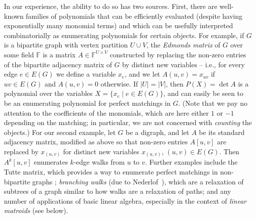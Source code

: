 \documentclass{theoretics}
\newcommand{\F}{\ensuremath{\mathbb F}\xspace}
\begin{document}
In our experience, the ability to do so has two sources. First, there are
well-known families of polynomials that can be efficiently evaluated
(despite having exponentially many monomial terms) and which can be
usefully interpreted combinatorially as enumerating polynomials for
certain objects. For example, if $G$ is a bipartite graph with vertex
partition $U \cup V$, the \emph{Edmonds matrix} of $G$ over some field $\F$ 
is a matrix $A \in \F^{U \times V}$ constructed by replacing
the non-zero entries of the bipartite adjacency matrix of $G$ by
distinct new variables -- i.e., for every edge $e \in E(G)$ we define
a variable $x_e$, and we let $A(u,v)=x_{uv}$ if $uv \in E(G)$ and
$A(u,v)=0$ otherwise. If $|U|=|V|$, then $P(X)=\det A$ is a polynomial
over the variables $X=\{x_e \mid e \in E(G)\}$, and can easily be seen
to be an enumerating polynomial for perfect matchings in $G$.
(Note that we pay no attention to the coefficients of the monomials,
which are here either $1$ or $-1$ depending on the matching; in
particular, we are not concerned with \emph{counting} the objects.)
For our second example, let $G$ be a digraph, and let $A$ be its
standard adjacency matrix, modified as above so that
non-zero entries $A[u,v]$ are replaced by $x_{(u,v)}$
for distinct new variables $x_{(u,v)}$, $(u,v) \in E(G)$.
Then $A^k[u,v]$ enumerates $k$-edge walks from $u$ to $v$.
Further examples include the Tutte matrix, which provides a
way to enumerate perfect matchings in non-bipartite graphs \cite{Tutte47};
\emph{branching walks} (due to Nederlof~\cite{Nederlof13algorithmica}), which are
a relaxation of subtrees of a graph similar to how walks are a
relaxation of paths; and any number of applications of basic linear
algebra, especially in the context of \emph{linear matroids} (see below). 
\end{document}
